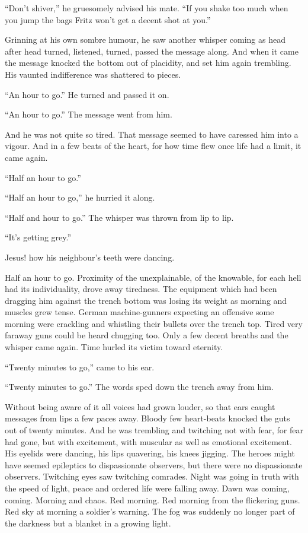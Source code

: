 ``Don't shiver,'' he gruesomely advised his mate. ``If you shake too much when you jump the bags Fritz won't get a decent shot at you.''

Grinning at his own sombre humour, he saw another whisper coming as head after head turned, listened, turned, passed the message along. And when it came the message knocked the bottom out of placidity, and set him again trembling. His vaunted indifference was shattered to pieces.

``An hour to go.'' He turned and passed it on.

``An hour to go.'' The message went from him.

And he was not quite so tired. That message seemed to have caressed him into a vigour. And in a few beats of the heart, for how time flew once life had a limit, it came again.

``Half an hour to go.''

``Half an hour to go,'' he hurried it along.

``Half and hour to go.'' The whisper was thrown from lip to lip.

``It's getting grey.''

Jesus! how his neighbour's teeth were dancing.

Half an hour to go. Proximity of the unexplainable, of the knowable, for each hell had its individuality, drove away tiredness. The equipment which had been dragging him against the trench bottom was losing its weight as morning and muscles grew tense. German machine-gunners expecting an offensive some morning were crackling and whistling their bullets over the trench top. Tired very faraway guns could be heard chugging too. Only a few decent breaths and the whisper came again. Time hurled its victim toward eternity.

``Twenty minutes to go,'' came to his ear.

``Twenty minutes to go.'' The words sped down the trench away from him.

Without being aware of it all voices had grown louder, so that ears caught messages from lips a few paces away. Bloody few heart-beats knocked the guts out of twenty minutes. And he was trembling and twitching not with fear, for fear had gone, but with excitement, with muscular as well as emotional excitement. His eyelids were dancing, his lips quavering, his knees jigging. The heroes might have seemed epileptics to dispassionate observers, but there were no dispassionate observers. Twitching eyes saw twitching comrades. Night was going in truth with the speed of light, peace and ordered life were falling away. Dawn was coming, coming. Morning and chaos. Red morning. Red morning from the flickering guns. Red sky at morning a soldier's warning. The fog was suddenly no longer part of the darkness but a blanket in a growing light.

